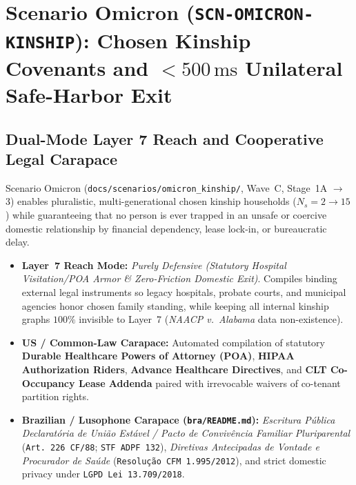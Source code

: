 \chapter{Scenario Omicron (\texttt{SCN-OMICRON-KINSHIP}): Chosen Kinship Covenants and \texorpdfstring{$<500\,\mathrm{ms}$}{<500 ms} Unilateral Safe-Harbor Exit}
\label{app:scenario-omicron}

\section{Dual-Mode Layer 7 Reach and Cooperative Legal Carapace}
Scenario Omicron (\texttt{docs/scenarios/omicron\_kinship/}, Wave~C, Stage~1A $\to$ 3) enables pluralistic, multi-generational chosen kinship households ($N_s = 2 \to 15$) while guaranteeing that no person is ever trapped in an unsafe or coercive domestic relationship by financial dependency, lease lock-in, or bureaucratic delay.
\begin{itemize}
    \item \textbf{Layer~7 Reach Mode:} \textit{Purely Defensive (Statutory Hospital Visitation/POA Armor \& Zero-Friction Domestic Exit)}. Compiles binding external legal instruments so legacy hospitals, probate courts, and municipal agencies honor chosen family standing, while keeping all internal kinship graphs $100\%$ invisible to Layer~7 (\textit{NAACP v.~Alabama} data non-existence).
    \item \textbf{US / Common-Law Carapace:} Automated compilation of statutory \textbf{Durable Healthcare Powers of Attorney (POA)}, \textbf{HIPAA Authorization Riders}, \textbf{Advance Healthcare Directives}, and \textbf{CLT Co-Occupancy Lease Addenda} paired with irrevocable waivers of co-tenant partition rights.
    \item \textbf{Brazilian / Lusophone Carapace (\texttt{bra/README.md}):} \textit{Escritura P{\'u}blica Declarat{\'o}ria de Uni{\~a}o Est{\'a}vel / Pacto de Conviv{\^e}ncia Familiar Pluriparental} (\texttt{Art.~226 CF/88}; \texttt{STF ADPF~132}), \textit{Diretivas Antecipadas de Vontade e Procurador de Sa{\'u}de} (\texttt{Resolu{\c{c}}{\~a}o CFM 1.995/2012}), and strict domestic privacy under \texttt{LGPD Lei 13.709/2018}.
\end{itemize}

